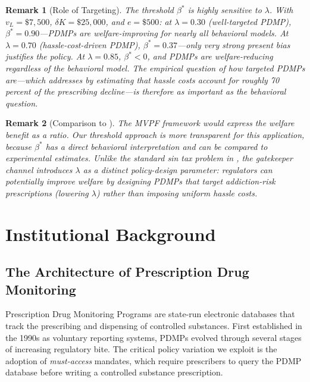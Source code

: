 \documentclass[12pt]{article}
\newtheorem{remark}{Remark}
\begin{document}
\begin{remark}[Role of Targeting]\label{rem:special}
The threshold $\beta^*$ is highly sensitive to $\lambda$. With $v_L = \$7{,}500$, $\delta K = \$25{,}000$, and $e = \$500$: at $\lambda = 0.30$ (well-targeted PDMP), $\beta^* = 0.90$---PDMPs are welfare-improving for nearly all behavioral models. At $\lambda = 0.70$ (hassle-cost-driven PDMP), $\beta^* = 0.37$---only very strong present bias justifies the policy. At $\lambda = 0.85$, $\beta^* < 0$, and PDMPs are welfare-reducing regardless of the behavioral model. The empirical question of how targeted PDMPs are---which \citet{buchmueller2018effect} addresses by estimating that hassle costs account for roughly 70 percent of the prescribing decline---is therefore as important as the behavioral question.
\end{remark}

\begin{remark}[Comparison to \citet{hendren2020unified}]\label{rem:mvpf}
The MVPF framework would express the welfare benefit as a ratio. Our threshold approach is more transparent for this application, because $\beta^*$ has a direct behavioral interpretation and can be compared to experimental estimates. Unlike the standard sin tax problem in \citet{allcott2019regressive}, the gatekeeper channel introduces $\lambda$ as a distinct policy-design parameter: regulators can potentially improve welfare by designing PDMPs that target addiction-risk prescriptions (lowering $\lambda$) rather than imposing uniform hassle costs.
\end{remark}


\section{Institutional Background}\label{sec:background}

\subsection{The Architecture of Prescription Drug Monitoring}

Prescription Drug Monitoring Programs are state-run electronic databases that track the prescribing and dispensing of controlled substances. First established in the 1990s as voluntary reporting systems, PDMPs evolved through several stages of increasing regulatory bite. The critical policy variation we exploit is the adoption of \textit{must-access} mandates, which require prescribers to query the PDMP database before writing a controlled substance prescription.
\end{document}
